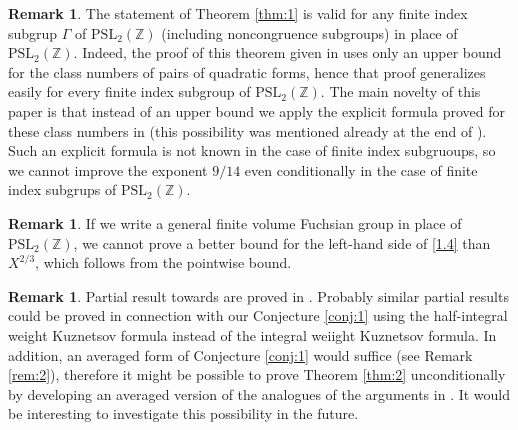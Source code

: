 \documentclass[12pt]{amsart}
\theoremstyle{definition}
\newtheorem{remark}[theorem]{Remark}
\numberwithin{equation}{section}
\newcommand{\PSL}{\mathrm{PSL}}
\newcommand{\ZZ}{\mathbb{Z}}
\newcommand{\PSLZ}{\PSL_2(\ZZ)}
\begin{document}
\begin{remark}The statement of Theorem \ref{thm:1} is
valid for any finite index subgrup $\Gamma$ of $\PSLZ$ (including
noncongruence subgroups) in place of $\PSLZ$. Indeed, the proof of this theorem given in
\cite{Biro} uses only an upper bound for the class
numbers of pairs of quadratic forms, hence that proof
generalizes easily for every finite index subgroup of
$\PSLZ$. The main novelty of this paper is that instead of
an upper bound we apply the explicit formula proved for these class numbers in
\cite{biroClass} (this possibility was mentioned already at
the end of \cite[Subsection 1.2]{Biro}). Such an explicit formula is not known in
the case of finite index subgruoups, so we cannot
improve the exponent $9/14$ even conditionally in the case
of finite index subgrups of $\PSLZ$.
\end{remark}



\begin{remark}If we write a general finite volume Fuchsian group
in place of $\PSLZ$, we cannot prove a better bound for
the left-hand side of \eqref{1.4} than $X^{2/3}$, which follows from the pointwise bound.
\end{remark}




\begin{remark}Partial result towards \cite[Conjecture 1.1]{Br} are
proved in \cite{St}. Probably similar partial results could
be proved in connection with our Conjecture \ref{conj:1}
using the half-integral weight Kuznetsov formula instead
of the integral weiight Kuznetsov formula. In addition,
an averaged form of Conjecture \ref{conj:1} would
suffice (see Remark \ref{rem:2}), therefore it might be
possible to prove Theorem \ref{thm:2} unconditionally by
developing an averaged version of the analogues of the
arguments in \cite{St}. It would be interesting to
investigate this possibility in the future.
\end{remark}
\end{document}
